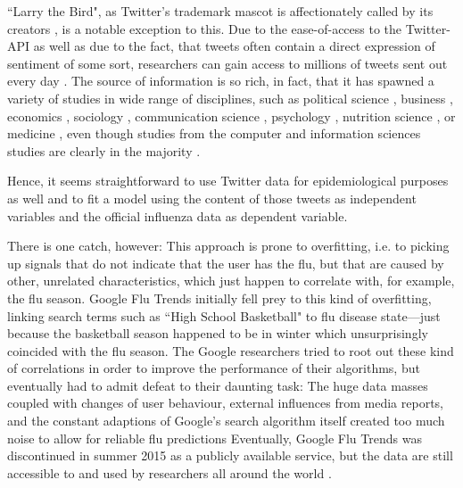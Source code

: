 \documentclass[11pt, a4paper,twoside]{report}\usepackage[]{graphicx}\usepackage[]{color}
\begin{document}
``Larry the Bird", as Twitter's trademark mascot is affectionately called by its creators \citep{rehak_twitterbird_2014}, is a notable exception to this. Due to the ease-of-access to the Twitter-API as well as due to the fact, that tweets often contain a direct expression of sentiment of some sort, researchers can gain access to millions of tweets sent out every day \citep{twitter_annual_2017}. The source of information is so rich, in fact, that it has spawned a variety of studies in wide range of disciplines, such as political science \citep{tumasjan2010predicting,tumasjan2011election,stieglitz2012political,newman2016tracking}, business \citep{swani2014should,chae2015insights}, economics \citep{bollen2011twitter,bollen2011modeling,zhang2012predicting,sul2014trading}, sociology \citep{poblete2011all,himelboim2013birds,mccormick2015using}, communication science \citep{zhao2009and,marwick2011tweet,himelboim2013birds,hermida2013journalism}, psychology \citep{chen2011tweet,golbeck2011predicting,qiu2012you,eichstaedt2015psychological,braithwaite2016validating}, nutrition science \citep{widener2014using,vidal2015using, abbar2015you}, or medicine \citep{salathe2013dynamics,love2013twitter,nwosu2014social,adrover2015identifying,eichstaedt2015psychological,mowery2017feature}, even though studies from the computer and information sciences studies are clearly in the majority \citep{lee2013real,zimmer2014topology,steiger2015advanced}. 

Hence, it seems straightforward to use Twitter data for epidemiological purposes as well and to fit a model using the content of those tweets as independent variables and the official influenza data as dependent variable.

There is one catch, however: This approach is prone to overfitting, i.e. to picking up signals that do not indicate that the user has the flu, but that are caused by other, unrelated characteristics, which just happen to correlate with, for example, the flu season. Google Flu Trends \citep{ginsberg_detecting_2009} initially fell prey to this kind of overfitting, linking search terms such as ``High School Basketball" to flu disease state---just because the basketball season happened to be in winter which unsurprisingly coincided with the flu season. The Google researchers tried to root out these kind of correlations in order to improve the performance of their algorithms, but eventually had to admit defeat to their daunting task: The huge data masses coupled with changes of user behaviour, external influences from media reports, and the constant adaptions of Google's search algorithm itself created too much noise to allow for reliable flu predictions \citep{olson_reassessing_2013,butler_when_2013,lazer_parable_2014} Eventually, Google Flu Trends was discontinued in summer 2015 as a publicly available service, but the data are still accessible to and used by researchers all around the world \citep{GFT_nextchapter_2015}.
\end{document}

